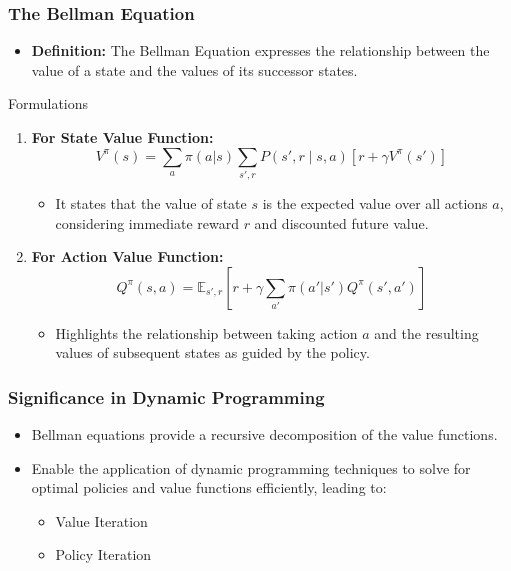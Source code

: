 \documentclass{beamer}
\begin{document}
\begin{frame}[fragile]
    \frametitle{The Bellman Equation}
    \begin{itemize}
        \item \textbf{Definition:} The Bellman Equation expresses the relationship between the value of a state and the values of its successor states.
    \end{itemize}
    \begin{block}{Formulations}
        \begin{enumerate}
            \item \textbf{For State Value Function:}
                \[
                V^\pi(s) = \sum_{a} \pi(a|s) \sum_{s', r} P(s', r \mid s, a) [r + \gamma V^\pi(s')]
                \]
                \begin{itemize}
                    \item It states that the value of state $s$ is the expected value over all actions $a$, considering immediate reward $r$ and discounted future value.
                \end{itemize}
                
            \item \textbf{For Action Value Function:}
                \[
                Q^\pi(s, a) = \mathbb{E}_{s', r}[r + \gamma \sum_{a'} \pi(a'|s') Q^\pi(s', a')]
                \]
                \begin{itemize}
                    \item Highlights the relationship between taking action $a$ and the resulting values of subsequent states as guided by the policy.
                \end{itemize}
        \end{enumerate}
    \end{block}
\end{frame}

\begin{frame}[fragile]
    \frametitle{Significance in Dynamic Programming}
    \begin{itemize}
        \item Bellman equations provide a recursive decomposition of the value functions.
        \item Enable the application of dynamic programming techniques to solve for optimal policies and value functions efficiently, leading to:
        \begin{itemize}
            \item Value Iteration
            \item Policy Iteration
        \end{itemize}
    \end{itemize}
\end{frame}
\end{document}
